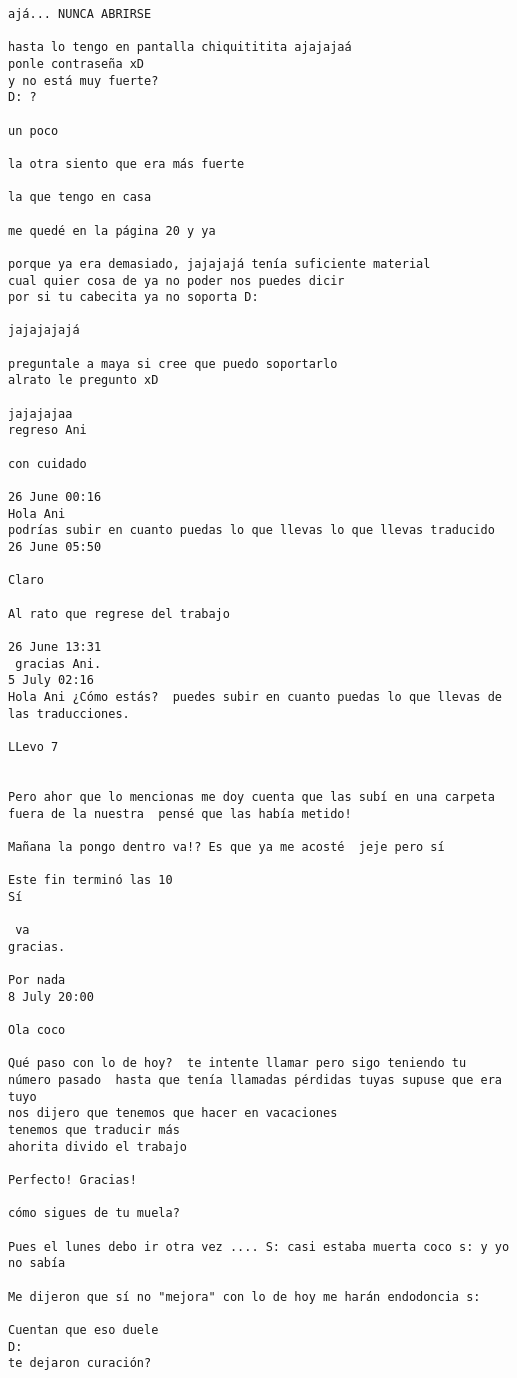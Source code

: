\begin{verbatim}
ajá... NUNCA ABRIRSE

hasta lo tengo en pantalla chiquititita ajajajaá
ponle contraseña xD
y no está muy fuerte?
D: ?

un poco

la otra siento que era más fuerte

la que tengo en casa

me quedé en la página 20 y ya

porque ya era demasiado, jajajajá tenía suficiente material
cual quier cosa de ya no poder nos puedes dicir
por si tu cabecita ya no soporta D:

jajajajajá

preguntale a maya si cree que puedo soportarlo
alrato le pregunto xD

jajajajaa
regreso Ani 

con cuidado

26 June 00:16
Hola Ani 
podrías subir en cuanto puedas lo que llevas lo que llevas traducido 
26 June 05:50

Claro 

Al rato que regrese del trabajo

26 June 13:31
 gracias Ani.
5 July 02:16
Hola Ani ¿Cómo estás?  puedes subir en cuanto puedas lo que llevas de las traducciones. 

LLevo 7


Pero ahor que lo mencionas me doy cuenta que las subí en una carpeta fuera de la nuestra  pensé que las había metido!

Mañana la pongo dentro va!? Es que ya me acosté  jeje pero sí

Este fin terminó las 10 
Sí 

 va
gracias.

Por nada 
8 July 20:00

Ola coco

Qué paso con lo de hoy?  te intente llamar pero sigo teniendo tu número pasado  hasta que tenía llamadas pérdidas tuyas supuse que era tuyo
nos dijero que tenemos que hacer en vacaciones
tenemos que traducir más
ahorita divido el trabajo

Perfecto! Gracias!

cómo sigues de tu muela?

Pues el lunes debo ir otra vez .... S: casi estaba muerta coco s: y yo no sabía

Me dijeron que sí no "mejora" con lo de hoy me harán endodoncia s:

Cuentan que eso duele 
D:
te dejaron curación?


\end{verbatim}
